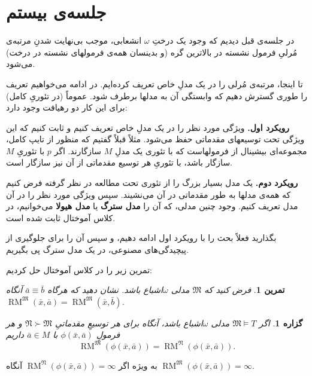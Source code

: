 \documentclass[12pt,a4paper]{report}
\theoremstyle{colorhead}
\newtheorem{tam}[thm]{تمرین}
\newtheorem{prop}[thm]{گزاره}
\DeclareMathOperator{\RM}{RM}
\begin{document}
\section{جلسه‌ی بیستم}
در جلسه‌ی قبل دیدیم که وجود یک درختِ 
$\omega$
انشعابی، موجب بی‌نهایت شدنِ‌ مرتبه‌ی مُرلیِ فرمول نشسته در بالاترین گره (و بدینسان
 همه‌ی فرمولهای نشسته در درخت) می‌شود. 
 \par 
تا اینجا، مرتبه‌ی مُرلی را در یک مدلِ خاص تعریف کرده‌ایم. در ادامه می‌خواهیم
 تعریف را طوری گسترش دهیم که وابستگی
آن به مدلها برطرف شود. عموماً (در تئوریِ کامل) برای این کار 
دو رهیافت وجود دارد:
\par 
\textbf{رویکرد اول.}
ویژگی مورد نظر را در یک مدلِ خاص تعریف کنیم و ثابت کنیم که این ویژگی تحت توسیعهای مقدماتی حفظ می‌شود. مثلاً 
قبلاً گفتیم که منظور از تایپ کامل، مجموعه‌ای بیشینال از فرمولهاست که با تئوری یک مدلِ
$M$
سازگارند. اگر 
$p$
با تئوریِ
$M$
سازگار باشد، با تئوریِ هر توسیع مقدماتی از آن نیز سازگار است. 
\par 
\textbf{رویکرد دوم. }
یک مدل بسیار بزرگ را از تئوری تحت مطالعه در نظر گرفته فرض کنیم که همه‌ی مدلها به طور مقدماتی در آن می‌نشیند. سپس ویژگی مورد نظر را در آن مدل تعریف کنیم. وجود چنین مدلی، که آن را 
\textbf{مدل سترگ }
یا 
\textbf{مدل هیولا}
می‌خوانیم، در کلاس آموختال ثابت شده است. 
\par 
بگذارید فعلاً بحث را با رویکرد اول ادامه دهیم، و سپس آن را
 برای جلوگیری از پیچیدگی‌های مصنوعی،  در یک مدل سترگ پی بگیریم. 
 \par 
تمرین زیر را در کلاس آموختال حل کردیم:
\begin{tam}
	فرض کنید که
	$\mathfrak{M}$
	مدلی
$\omega$اشباع
	باشد. نشان دهید که هرگاه
$\bar{a}\equiv \bar{b}$
آنگاه
$\RM^\mathfrak{M}(\bar{x},\bar{a})=\RM^\mathfrak{M}(\bar{x},\bar{b})$.
	\end{tam}
\begin{prop}
	اگر
	$\mathfrak{M}\models T$
مدلی
$\omega$اشباع 
باشد، آنگاه برای هر توسیعِ مقدماتیِ
$\mathfrak{N}\succ \mathfrak{M}$
و هر فرمولِ
$\phi(\bar{x},\bar{a})$
با
$\bar{a}\in M$
داریم
\[
\RM^\mathfrak{M}(\phi(\bar{x},\bar{a}))=\RM^\mathfrak{N}(\phi(\bar{x},\bar{a})).
\]
	\end{prop}
به ويژه اگر
$\RM^\mathfrak{N}(\phi(\bar{x},\bar{a}))=\infty$
آنگاه
$\RM^\mathfrak{M}(\phi(\bar{x},\bar{a}))=\infty$.
\end{document}
